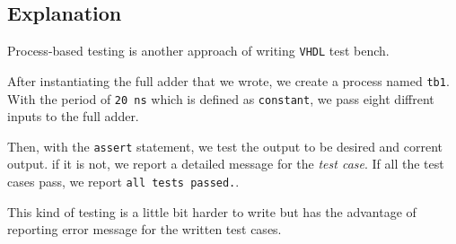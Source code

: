\documentclass[dvipsnames, svgnames, x11names, a4paper, 11pt,]{article}
\begin{document}
\subsection{Explanation}
Process-based testing is another approach of writing \texttt{VHDL} test bench.

After instantiating the full adder that we wrote, we create a process named \texttt{tb1}. With the period of \texttt{20 ns} which is defined as \texttt{constant}, we pass eight diffrent inputs to the full adder.

Then, with the \texttt{assert} statement, we test the output to be desired and corrent output.
if it is not, we report a detailed message for the \textit{test case}. If all the test cases pass, we report \texttt{all tests passed.}.

This kind of testing is a little bit harder to write but has the advantage of reporting error message for the written test cases.
\end{document}
